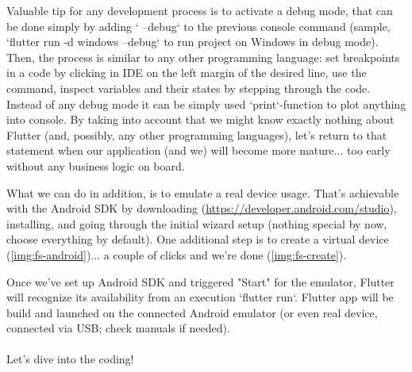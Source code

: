 Valuable tip for any development process is to activate a debug mode, that can be done simply by adding ` --debug` to 
the previous console command (sample, `flutter run -d windows --debug` to run project on Windows in debug mode). Then, 
the process is similar to any other programming language: set breakpoints in a code by clicking in IDE on the left 
margin of the desired line, use the command, inspect variables and their states by stepping through the code. Instead of
any debug mode it can be simply used `print`-function to plot anything into console. By taking into account that we 
might know exactly nothing about Flutter (and, possibly, any other programming languages), let's return to that 
statement when our application (and we) will become more mature... too early without any business logic on board.


What we can do in addition, is to emulate a real device usage. That's achievable with the Android SDK by downloading 
(\href{https://developer.android.com/studio}{https://developer.android.com/studio}), installing, and going through 
the initial wizard setup (nothing special by now, choose everything by default). One additional step is to create a 
virtual device (\cref{img:fs-android})... a couple of clicks and we're done (\cref{img:fs-create}).



Once we've set up Android SDK and triggered "Start" for the emulator, Flutter will recognize its availability from
an execution `flutter run`. Flutter app will be build and launched on the connected Android emulator (or even real 
device, connected via USB; check manuals if needed).\\
\\

\noindent Let's dive into the coding!